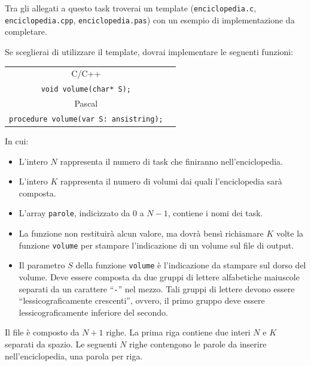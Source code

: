 \begin{warning}
Tra gli allegati a questo task troverai un template (\texttt{enciclopedia.c}, \texttt{enciclopedia.cpp}, \texttt{enciclopedia.pas}) con un esempio di implementazione da completare.
\end{warning}

Se sceglierai di utilizzare il template, dovrai implementare le seguenti funzioni:
\begin{center}\begin{tabularx}{\textwidth}{|c|X|}
\hline
C/C++  & \begin{tabular}[x]{@{}@{}}\verb|void rilega(int N, int K, char* parole[]);|\\ \verb|void volume(char* S);|\end{tabular}\\
\hline
Pascal & \begin{tabular}[x]{@{}@{}}\verb|procedure rilega(N, K: longint; var parole: array of ansistring);|\\ \verb|procedure volume(var S: ansistring);|\end{tabular}\\
\hline
\end{tabularx}\end{center}
In cui:
\begin{itemize}[nolistsep]
  \item L'intero $N$ rappresenta il numero di task che finiranno nell'enciclopedia.
  \item L'intero $K$ rappresenta il numero di volumi dai quali l'enciclopedia sarà composta.
  \item L'array \texttt{parole}, indicizzato da $0$ a $N-1$, contiene i nomi dei task.
  \item La funzione non restituirà alcun valore, ma dovrà bensì richiamare $K$ volte la funzione \texttt{volume} per stampare l'indicazione di un volume sul file di output.
  \item Il parametro $S$ della funzione \texttt{volume} è l'indicazione da stampare sul dorso del volume. Deve essere composta da due gruppi di lettere alfabetiche maiuscole separati da un carattere ``\texttt{-}'' nel mezzo. Tali gruppi di lettere devono essere ``lessicograficamente crescenti'', ovvero, il primo gruppo deve essere lessicograficamente inferiore del secondo.
\end{itemize}

\InputFile
Il file  è composto da $N+1$ righe. La prima riga contiene due interi $N$ e $K$ separati da spazio. Le seguenti $N$ righe contengono le parole da inserire nell'enciclopedia, una parola per riga.

